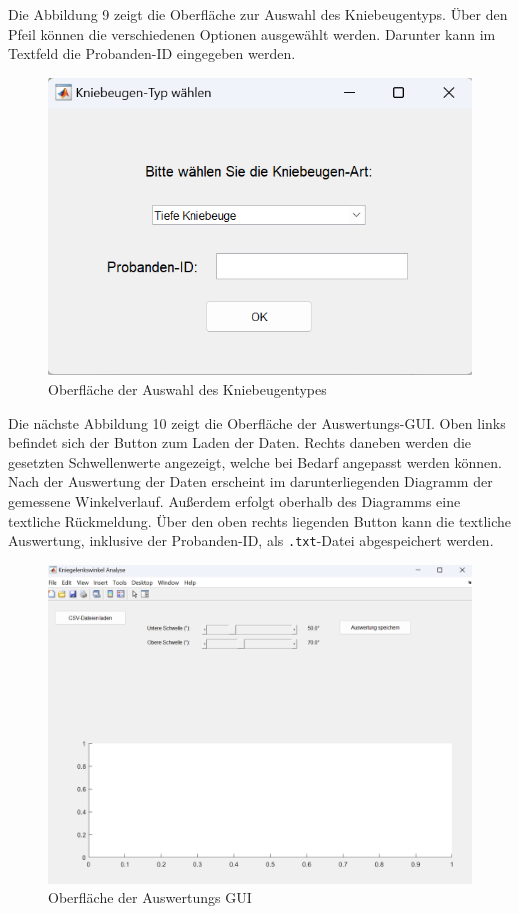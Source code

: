 \noindent Die Abbildung 9 zeigt die Oberfläche zur Auswahl des Kniebeugentyps. Über den Pfeil können die verschiedenen Optionen ausgewählt werden. Darunter kann im Textfeld die Probanden-ID eingegeben werden.
\begin{figure}[ht]\centering
\includegraphics[width=0.75\linewidth]{images/Auswahl_GUI.png}
\caption{Oberfläche der Auswahl des Kniebeugentypes}
\label{fig:Kalibrierungs GUI}
\end{figure}
\noindent \noindent Die nächste Abbildung 10 zeigt die Oberfläche der Auswertungs-GUI. Oben links befindet sich der Button zum Laden der Daten. Rechts daneben werden die gesetzten Schwellenwerte angezeigt, welche bei Bedarf angepasst werden können.
\noindent Nach der Auswertung der Daten erscheint im darunterliegenden Diagramm der gemessene Winkelverlauf. Außerdem erfolgt oberhalb des Diagramms eine textliche Rückmeldung.
\noindent Über den oben rechts liegenden Button kann die textliche Auswertung, inklusive der Probanden-ID, als \texttt{.txt}-Datei abgespeichert werden.
\begin{figure}[ht]\centering
\includegraphics[width=0.75\linewidth]{images/Auswertungs_GUi.png}
\caption{Oberfläche der Auswertungs GUI}
\label{fig:Kalibrierungs GUI}
\end{figure}

